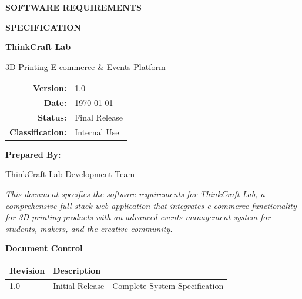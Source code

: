 ﻿\documentclass[11pt]{article}
\begin{document}
\begin{titlepage}
    \centering
    \vspace*{2cm}
    
    {\Huge \textbf{SOFTWARE REQUIREMENTS}\par}
    {\Huge \textbf{SPECIFICATION}\par}
    
    \vspace{1.5cm}
    
    {\LARGE \textbf{ThinkCraft Lab}\par}
    \vspace{0.3cm}
    {\Large 3D Printing E-commerce \& Events Platform\par}
    
    \vspace{2cm}
    
    \begin{tabular}{rl}
        \textbf{Version:} & 1.0 \\[0.3cm]
        \textbf{Date:} & \today \\[0.3cm]
        \textbf{Status:} & Final Release \\[0.3cm]
        \textbf{Classification:} & Internal Use \\
    \end{tabular}
    
    \vspace{2cm}
    
    {\large \textbf{Prepared By:}\par}
    \vspace{0.3cm}
    {\large ThinkCraft Lab Development Team\par}
    
    \vspace{1.5cm}
    
    \begin{minipage}{0.8\textwidth}
        \centering
        \textit{This document specifies the software requirements for ThinkCraft Lab, a comprehensive full-stack web application that integrates e-commerce functionality for 3D printing products with an advanced events management system for students, makers, and the creative community.}
    \end{minipage}
    
    \vfill
    
    {\small \textbf{Document Control}\par}
    \vspace{0.2cm}
    \begin{tabular}{|l|l|}
        \hline
        \textbf{Revision} & \textbf{Description} \\
        \hline
        1.0 & Initial Release - Complete System Specification \\
        \hline
    \end{tabular}
    
\end{titlepage}
\end{document}
